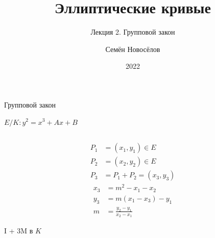 \documentclass{beamer}
\title{Эллиптические кривые}
\subtitle{Лекция 2. Групповой закон}
\author{Семён Новосёлов}
\institute{БФУ им. И. Канта}
\date{2022}
\begin{document}
	
	\frame{\titlepage}
	
	\begin{frame}{Групповой закон}%
		\begin{center}
			$E/K: y^2 = x^3 + Ax + B$
		\end{center}
		\begin{columns}
			\begin{column}{0.5\textwidth}
				\begin{equation*}
					\begin{split}
						P_1 &= (x_1, y_1) \in E \\
						P_2 &= (x_2, y_2) \in E \\
						P_3 &= P_1 + P_2 = \left(x_3, y_3\right)
					\end{split}
				\end{equation*}
				\begin{equation*}
					\begin{split}
						x_3 &= m^2 - x_1 - x_2 \\
						y_3 &= m\left( x_1 - x_3 \right) - y_1 \\
						m &= \frac{y_2 - y_1}{x_2 - x_1}
					\end{split}
				\end{equation*}
				\begin{center}
					\begin{tcolorbox}[enhanced,hbox,colback=box-blue-color!15,colframe=box-blue-color,title=Сложность,center title]
						\begin{varwidth}{\textwidth}
							\begin{center}
								I + $3$M в $K$
							\end{center}
						\end{varwidth}
					\end{tcolorbox}	
				\end{center}
				

\end{column}
\end{columns}
\end{frame}
\end{document}
